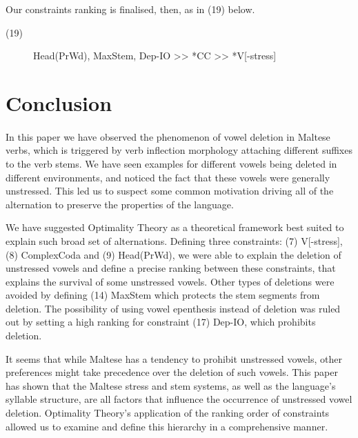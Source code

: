 \documentclass[12pt,draft]{article}
\begin{document}
Our constraints ranking is finalised, then, as in (19) below.

\begin{description}
	\item[(19)] {\sc Head(PrWd), MaxStem, Dep-IO >> *CC >> *V[-stress]}
\end{description}

\section{Conclusion}

\paragraph*{}
In this paper we have observed the phenomenon of vowel deletion in Maltese verbs, which is triggered by verb inflection morphology attaching different suffixes to the verb stems. We have seen examples for different vowels being deleted in different environments, and noticed the fact that these vowels were generally unstressed. This led us to suspect some common motivation driving all of the alternation to preserve the properties of the language.

We have suggested Optimality Theory as a theoretical framework best suited to explain such broad set of alternations.
Defining three constraints: (7) {\sc V[-stress]}, (8) {\sc *ComplexCoda} and (9) {\sc Head(PrWd)}, we were able to explain the deletion of unstressed vowels and define a precise ranking between these constraints, that explains the survival of some unstressed vowels.
Other types of deletions were avoided by defining (14) {\sc MaxStem} which protects the stem segments from deletion.
The possibility of using vowel epenthesis instead of deletion was ruled out by setting a high ranking for constraint (17) {\sc Dep-IO}, which prohibits deletion.

It seems that while Maltese has a tendency to prohibit unstressed vowels, other preferences might take precedence over the deletion of such vowels. This paper has shown that the Maltese stress and stem systems, as well as the language's syllable structure, are all factors that influence the occurrence of unstressed vowel deletion.
Optimality Theory's application of the ranking order of constraints allowed us to examine and define this hierarchy in a comprehensive manner.



\end{document}
